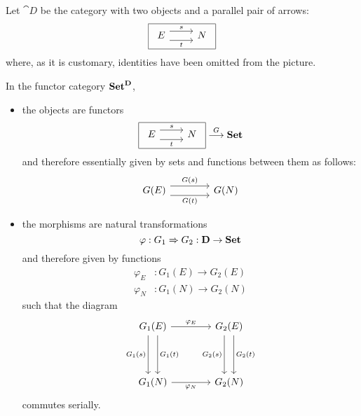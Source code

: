 \begin{example}
Let $\cat D$ be the category with two objects and a parallel pair of arrows:
\[
  \begin{array}{|c|}\hline 
  \begin{tikzcd}
    E
      \arrow[shift left=+2, "s"above]{r}
      \arrow[shift left=-2, "t"below]{r}
    &
    N %
  \end{tikzcd}
  \\ \hline \end{array}
\]
where, as it is customary, identities have been omitted from the picture.

In the functor category $\mathbf {Set}^{\mathbf D}$, 
\begin{itemize}
\item
the objects are functors
\[
  \begin{array}{|c|}\hline 
  \begin{tikzcd}
  E \arrow[shift left=+2, "s"above]{r} \arrow[shift left=-2, "t"below]{r} 
  & N
  \end{tikzcd}
  \\ \hline \end{array}
  \overset G\longrightarrow 
  \catset 
\]
and therefore essentially given by sets and functions between them as follows:
\[
  \begin{tikzcd}[sep=4em]
  G(E) \arrow[shift left=+2, "G(s)"above]{r} 
  \arrow[shift left=-2, "G(t)"below]{r} & G(N)
  \end{tikzcd}
\]

\item
the morphisms are natural transformations
\[
  \varphi : G_1 \Rightarrow G_2 : \mathbf D\to \mathbf {Set}
\]
and therefore given by functions 
\begin{align*}
  \varphi_E &: G_1(E) \longrightarrow G_2(E)
  \\[1mm]
  \varphi_N &: G_1(N) \longrightarrow G_2(N)
\end{align*}
such that the diagram
\[\begin{tikzcd}[sep=4em]
    G_1(E)
      \arrow["\varphi_E"]{r}
      \arrow[shift left=+2, "G_1(t)"right]{d}
      \arrow[shift left=-2, "G_1(s)"left]{d}
    &
    G_2(E)
    \arrow[shift left=+2, "G_2(t)"right]{d} 
    \arrow[shift left=-2, "G_2(s)"left]{d}
    \\
    G_1(N)
    \arrow["\varphi_N",swap]{r}
    &
    G_2(N)
\end{tikzcd}\]
commutes serially.
\end{itemize}
\end{example}

